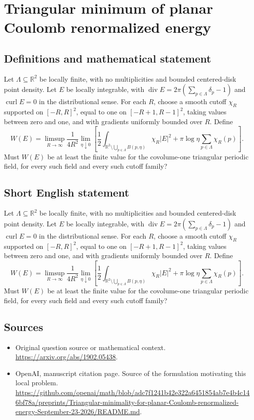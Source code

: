 \documentclass[11pt]{article}
\begin{document}
\section*{Triangular minimum of planar Coulomb renormalized energy}\label{30007130}
\subsection{Definitions and mathematical statement}
Let $\Lambda\subseteq\mathbb R^2$ be locally finite, with no multiplicities and bounded centered-disk point density. Let $E$ be locally integrable, with $\operatorname{div}E=2\pi(\sum_{p\in\Lambda}\delta_p-1)$ and $\operatorname{curl}E=0$ in the distributional sense. For each $R$, choose a smooth cutoff $\chi_R$ supported on $[-R,R]^2$, equal to one on $[-R+1,R-1]^2$, taking values between zero and one, and with gradients uniformly bounded over $R$. Define
\[W(E)=\limsup_{R\to\infty}\frac{1}{4R^2}\lim_{\eta\downarrow0}\left[\frac12\int_{\mathbb R^2\setminus\bigcup_{p\in\Lambda}B(p,\eta)}\chi_R|E|^2+\pi\log\eta\sum_{p\in\Lambda}\chi_R(p)\right].\]
Must $W(E)$ be at least the finite value for the covolume-one triangular periodic field, for every such field and every such cutoff family?
\subsection{Short English statement}
Let $\Lambda\subseteq\mathbb R^2$ be locally finite, with no multiplicities and bounded centered-disk point density. Let $E$ be locally integrable, with $\operatorname{div}E=2\pi(\sum_{p\in\Lambda}\delta_p-1)$ and $\operatorname{curl}E=0$ in the distributional sense. For each $R$, choose a smooth cutoff $\chi_R$ supported on $[-R,R]^2$, equal to one on $[-R+1,R-1]^2$, taking values between zero and one, and with gradients uniformly bounded over $R$. Define
\[W(E)=\limsup_{R\to\infty}\frac{1}{4R^2}\lim_{\eta\downarrow0}\left[\frac12\int_{\mathbb R^2\setminus\bigcup_{p\in\Lambda}B(p,\eta)}\chi_R|E|^2+\pi\log\eta\sum_{p\in\Lambda}\chi_R(p)\right].\]
Must $W(E)$ be at least the finite value for the covolume-one triangular periodic field, for every such field and every such cutoff family?
\subsection{Sources}
\begin{itemize}
\item[S1] Original question source or mathematical context.
\url{https://arxiv.org/abs/1902.05438}.
\item[S2] OpenAI, manuscript citation page. Source of the formulation motivating this local problem.
\url{https://github.com/openai/math/blob/adc7f1241b42e322a6451854ab7e4b4c146bf78a/preprints/Triangular-minimality-for-planar-Coulomb-renormalized-energy-September-23-2026/README.md}.
\end{itemize}
\end{document}
